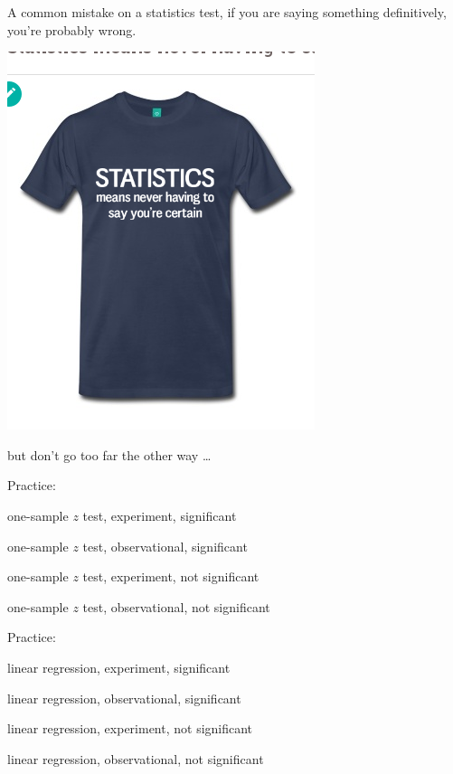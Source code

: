 \begin{frame}{A common mistake}
    on a statistics test, if you are saying something definitively,
    you're probably wrong.

    \begin{center}
        \includegraphics[height=0.7\textwidth]{never-certain}
    \end{center}

    \alert{but} don't go too far the other way \ldots
\end{frame}

\begin{frame}{Practice:}



    one-sample $z$ test, experiment, significant

    one-sample $z$ test, observational, significant


    one-sample $z$ test, experiment, not significant

    one-sample $z$ test, observational, not significant

\end{frame}

\begin{frame}{Practice:}

    linear regression, experiment, significant

    linear regression, observational, significant


    linear regression, experiment, not significant

    linear regression, observational, not significant

\end{frame}

